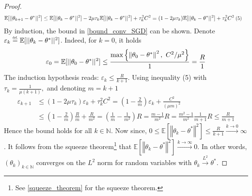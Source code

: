 \begin{proof}
\begin{align} 
    &\mathbb{E}[||\theta_{k+1}-\theta^{*}||^{2}]\leq \mathbb{E}[||\theta_{k}-\theta^{*}||^{2}] - 2\mu \tau_{k} \mathbb{E}[||\theta_{k}-\theta^{*}||^{2}] + \tau_{k}^{2} C^{2} = (1 - 2\mu \tau_{k}) \mathbb{E}[||\theta_{k}-\theta^{*}||^{2}] + \tau_{k}^{2} C^{2}\nonumber
    \hspace{0.075cm} \text{\scalebox{0.925}{(5)}}
\end{align}
By induction, the bound in \eqref{bound_conv_SGD} can be shown. Denote $\varepsilon_{k} \overset{\scalebox{0.5}{def.}}{=} \mathbb{E}[||\theta_{k}-\theta^{*}||^{2}]$. Indeed, for $k = 0$, it holds $$\varepsilon_{0} = \mathbb{E}[||\theta_{0}-\theta^{*}||^{2}] \leq \frac{\textnormal{max}\left\{\left\Vert \theta_{0} - \theta^{*}\right\Vert^{2},\text{ } C^{2}/\mu^{2}\right\}}{1} = \frac{R}{1}$$
The induction hypothesis reads: $\varepsilon_{k} \leq \frac{R}{k+1}.$ Using inequality (5) with $\tau_{k} = \frac{1}{\mu(k+1)},$ and denoting $m = k+1$
\begin{align}
\varepsilon_{k+1}
    &\leq (1-2\mu \tau_{k}) \varepsilon_{k} + \tau_{k}^{2} C^{2} = \left(1-\frac{2}{m}\right)\varepsilon_{k} + \frac{C^{2}}{(\mu m)^{2}}\nonumber\\
    &\leq \left(1 - \frac{2}{m}\right)\frac{R}{m} + \frac{R}{m^{2}} = \left(\frac{1}{m} - \frac{1}{m^{2}}\right)R = \frac{m-1}{m^{2}}R = \frac{m^{2} - 1}{m^{2}}\frac{1}{m + 1}R \leq \frac{R}{m+1}\nonumber
\end{align}
Hence the bound holds for all $k \in \mathbb{N}.$ Now since, $0 \leq \mathbb{E}[\left\Vert \theta_{k} - \theta^{*}\right\Vert^{2}] \leq \frac{R}{k+1} \xrightarrow{k \rightarrow 0} \infty$. It follows from the squeeze theorem\footnote{See \ref{squeeze_theorem} for the squeeze theorem.} that $\mathbb{E}[\left\Vert \theta_{k} - \theta^{*}\right\Vert^{2}] \xrightarrow{k \rightarrow \infty} 0.$ In other words, $(\theta_{k})_{k\in\mathbb{N}}$ converges on the $L^{2}$ norm for random variables with $\theta_{k} \xrightarrow{L^{2}} \theta^{*}.$ 
\end{proof}
